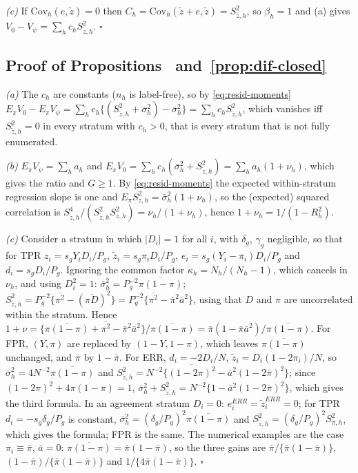 \emph{(c)} If $\mathrm{Cov}_h(e,\tilde z)=0$ then $C_h=\mathrm{Cov}_h(\tilde z+e,\tilde z)=S^2_{\tilde z,h}$, so $\beta_h=1$ and (a) gives $V_0-V_\psi=\sum_hc_hS^2_{\tilde z,h}$. $\square$

\subsection{Proof of Propositions~ and~\ref{prop:dif-closed}}

\emph{(a)} The $c_h$ are constants ($n_h$ is label-free), so by \eqref{eq:resid-moments}
$E_\pi V_0-E_\pi V_\psi=\sum_hc_h\{(S^2_{\tilde z,h}+\bar\sigma^2_h)-\bar\sigma^2_h\}=\sum_hc_hS^2_{\tilde z,h}$, which vanishes iff $S^2_{\tilde z,h}=0$ in every stratum with $c_h>0$, that is every stratum that is not fully enumerated.

\emph{(b)} $E_\pi V_\psi=\sum_ha_h$ and $E_\pi V_0=\sum_hc_h(\bar\sigma^2_h+S^2_{\tilde z,h})=\sum_ha_h(1+\nu_h)$, which gives the ratio and $G\ge1$. By \eqref{eq:resid-moments} the expected within-stratum
regression slope is one and $E_\pi S^2_{z,h}=\bar\sigma^2_h(1+\nu_h)$, so the (expected) squared correlation is $S^4_{\tilde z,h}/(S^2_{\tilde z,h}S^2_{z,h})=\nu_h/(1+\nu_h)$, hence $1+\nu_h=1/(1-R_h^2)$.

\emph{(c)} Consider a stratum in which $|D_i|=1$ for all $i$, with $\delta_g$, $\gamma_g$ negligible, so that for TPR $z_i=s_gY_iD_i/P_g$, $\tilde z_i=s_g\pi_iD_i/P_g$,
$e_i=s_g(Y_i-\pi_i)D_i/P_g$ and $d_i=s_gD_i/P_g$. Ignoring the common factor $\kappa_h=N_h/(N_h-1)$, which cancels in $\nu_h$, and using $D_i^2=1$:
$\bar\sigma^2_h=P_g^{-2}\overline{\pi(1-\pi)}$; $S^2_{\tilde z,h}=P_g^{-2}\{\overline{\pi^2}-(\overline{\pi D})^2\}=P_g^{-2}\{\overline{\pi^2}-\bar\pi^2\bar a^2\}$, using that $D$ and $\pi$ are uncorrelated within the stratum.
Hence $1+\nu=\{\overline{\pi(1-\pi)}+\overline{\pi^2}-\bar\pi^2\bar a^2\}/\overline{\pi(1-\pi)}=\bar\pi(1-\bar\pi\bar a^2)/\overline{\pi(1-\pi)}$. For FPR, $(Y,\pi)$ are replaced by $(1-Y,1-\pi)$, which leaves
$\overline{\pi(1-\pi)}$ unchanged, and $\bar\pi$ by $1-\bar\pi$. For ERR, $d_i=-2D_i/N$, $\tilde z_i=D_i(1-2\pi_i)/N$, so $\bar\sigma^2_h=4N^{-2}\overline{\pi(1-\pi)}$ and
$S^2_{\tilde z,h}=N^{-2}\{\overline{(1-2\pi)^2}-\bar a^2(1-2\bar\pi)^2\}$; since $(1-2\pi)^2+4\pi(1-\pi)=1$, $\bar\sigma^2_h+S^2_{\tilde z,h}=N^{-2}\{1-\bar a^2(1-2\bar\pi)^2\}$, which gives the third formula. In an agreement stratum
$D_i=0$: $e^{ERR}_i=\tilde z^{ERR}_i=0$; for TPR $d_i=-s_g\delta_g/P_g$ is constant, $\bar\sigma^2_h=(\delta_g/P_g)^2\overline{\pi(1-\pi)}$ and $S^2_{\tilde z,h}=(\delta_g/P_g)^2S^2_{\pi,h}$, which gives the formula; FPR is the same.
The numerical examples are the case $\pi_i\equiv\bar\pi$, $\bar a=0$: $\overline{\pi(1-\pi)}=\bar\pi(1-\bar\pi)$, so the three gains are $\bar\pi/\{\bar\pi(1-\bar\pi)\}$, $(1-\bar\pi)/\{\bar\pi(1-\bar\pi)\}$ and $1/\{4\bar\pi(1-\bar\pi)\}$. $\square$

